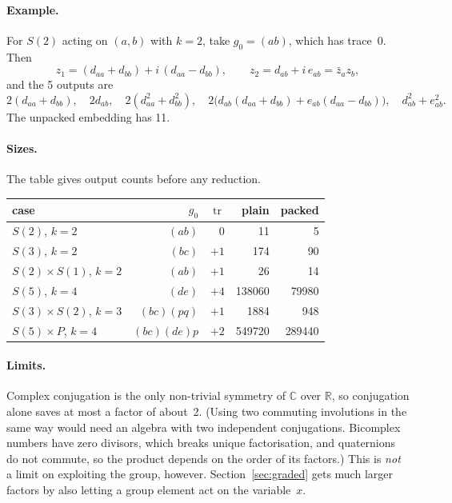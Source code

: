 \documentclass[11pt]{article}
\theoremstyle{definition}
\theoremstyle{remark}
\begin{document}
\paragraph{Example.}
For $S(2)$ acting on $(a, b)$ with $k = 2$, take $g_0 = (ab)$, which has trace~0.
Then
\[
  z_1 = (d_{aa} + d_{bb}) + i\,(d_{aa} - d_{bb}), \qquad
  z_2 = d_{ab} + i\,e_{ab} = \bar z_a z_b ,
\]
and the 5 outputs are
\[
  2(d_{aa} + d_{bb}),\quad 2 d_{ab},\quad 2(d_{aa}^2 + d_{bb}^2),\quad
  2\bigl(d_{ab}(d_{aa} + d_{bb}) + e_{ab}(d_{aa} - d_{bb})\bigr),\quad
  d_{ab}^2 + e_{ab}^2 .
\]
The unpacked embedding has 11.

\paragraph{Sizes.}
The table gives output counts before any reduction.
\begin{center}
\begin{tabular}{lrrrr}
  case & $g_0$ & $\operatorname{tr}$ & plain & packed \\ \hline
  $S(2)$, $k=2$                 & $(ab)$        & $0$  & 11     & 5 \\
  $S(3)$, $k=2$                 & $(bc)$        & $+1$ & 174    & 90 \\
  $S(2)\times S(1)$, $k=2$      & $(ab)$        & $+1$ & 26     & 14 \\
  $S(5)$, $k=4$                 & $(de)$        & $+4$ & 138060 & 79980 \\
  $S(3)\times S(2)$, $k=3$      & $(bc)(pq)$    & $+1$ & 1884   & 948 \\
  $S(5)\times P$, $k=4$         & $(bc)(de)p$   & $+2$ & 549720 & 289440
\end{tabular}
\end{center}

\paragraph{Limits.}
Complex conjugation is the only non-trivial symmetry of $\mathbb{C}$ over
$\mathbb{R}$, so conjugation alone saves at most a factor of about~2. (Using
two commuting involutions in the same way would need an algebra with two
independent conjugations. Bicomplex numbers have zero divisors, which breaks
unique factorisation, and quaternions do not commute, so the product depends on
the order of its factors.) This is \emph{not} a limit on exploiting the group,
however. Section~\ref{sec:graded} gets much larger factors by also letting a
group element act on the variable~$x$.
\end{document}
